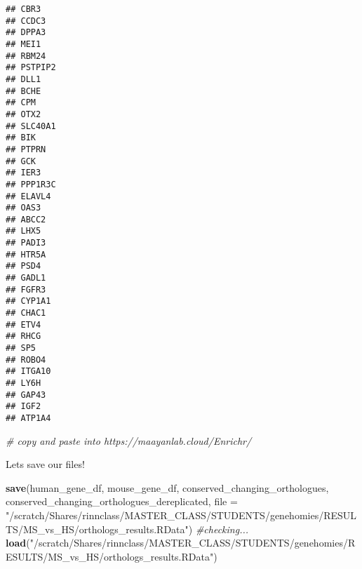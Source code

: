\documentclass[
]{article}
\newenvironment{Shaded}{\begin{snugshade}}{\end{snugshade}}
\newcommand{\AttributeTok}[1]{\textcolor[rgb]{0.13,0.29,0.53}{#1}}
\newcommand{\CommentTok}[1]{\textcolor[rgb]{0.56,0.35,0.01}{\textit{#1}}}
\newcommand{\FunctionTok}[1]{\textcolor[rgb]{0.13,0.29,0.53}{\textbf{#1}}}
\newcommand{\NormalTok}[1]{#1}
\newcommand{\StringTok}[1]{\textcolor[rgb]{0.31,0.60,0.02}{#1}}
\begin{document}
\begin{verbatim}
## CBR3
## CCDC3
## DPPA3
## MEI1
## RBM24
## PSTPIP2
## DLL1
## BCHE
## CPM
## OTX2
## SLC40A1
## BIK
## PTPRN
## GCK
## IER3
## PPP1R3C
## ELAVL4
## OAS3
## ABCC2
## LHX5
## PADI3
## HTR5A
## PSD4
## GADL1
## FGFR3
## CYP1A1
## CHAC1
## ETV4
## RHCG
## SP5
## ROBO4
## ITGA10
## LY6H
## GAP43
## IGF2
## ATP1A4
\end{verbatim}

\begin{Shaded}
\begin{Highlighting}[]
\CommentTok{\# copy and paste into https://maayanlab.cloud/Enrichr/ }
\end{Highlighting}
\end{Shaded}

Lets save our files!

\begin{Shaded}
\begin{Highlighting}[]
\FunctionTok{save}\NormalTok{(human\_gene\_df, mouse\_gene\_df, conserved\_changing\_orthologues, conserved\_changing\_orthologues\_dereplicated, }\AttributeTok{file =} \StringTok{"/scratch/Shares/rinnclass/MASTER\_CLASS/STUDENTS/genehomies/RESULTS/MS\_vs\_HS/orthologs\_results.RData"}\NormalTok{)}
\CommentTok{\#checking... }
\FunctionTok{load}\NormalTok{(}\StringTok{"/scratch/Shares/rinnclass/MASTER\_CLASS/STUDENTS/genehomies/RESULTS/MS\_vs\_HS/orthologs\_results.RData"}\NormalTok{)}
\end{Highlighting}
\end{Shaded}
\end{document}
